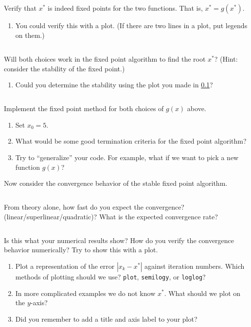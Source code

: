 \documentclass[11pt,letterpaper]{article}
\begin{document}
\subsection{}\label{sec:1c}
Verify that $x^*$ is indeed fixed points for the two functions. That is, $x^* = g(x^*)$. 
\begin{enumerate}
    \item You could verify this with a plot. (If there are two lines in a plot, put legends on them.)
\end{enumerate}

\subsection{}
Will both choices work in the fixed point algorithm to find the root $x^*$? (Hint: consider the stability of the fixed point.)
\begin{enumerate}
    \item Could you determine the stability using the plot you made in \ref{sec:1c}?
\end{enumerate}

\subsection{}
Implement the fixed point method for both choices of $g(x)$ above. 
\begin{enumerate}
    \item Set $x_0 = 5$.
    \item What would be some good termination criteria for the fixed point algorithm?
    \item Try to ``generalize'' your code. For example, what if we want to pick a new function $g(x)$?
\end{enumerate}

Now consider the convergence behavior of the stable fixed point algorithm. 

\subsection{}
From theory alone, how fast do you expect the convergence? (linear/superlinear/quadratic)? What is the expected convergence rate?

\subsection{}
Is this what your numerical results show? How do you verify the convergence behavior numerically? Try to show this with a plot. 
\begin{enumerate}
    \item Plot a representation of the error $|x_k-x^*|$ against iteration numbers. Which methods of plotting should we use? \texttt{plot}, \texttt{semilogy}, or \texttt{loglog}?
    \item In more complicated examples we do not know $x^*$. What should we plot on the $y$-axis?
    \item Did you remember to add a title and axis label to your plot?
\end{enumerate}
\end{document}
